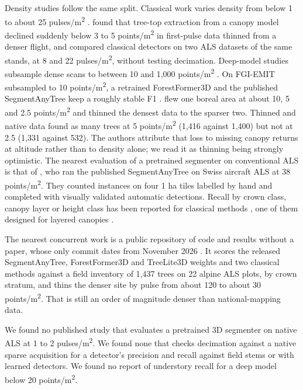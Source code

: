 \documentclass[preprint,12pt,authoryear,a4paper]{elsarticle}
\begin{document}
Density studies follow the same split. Classical work varies density from below
1 to about 25 pulses/m\textsuperscript{2} \citep{hirata2004effects,jakubowski2013tradeoffs,kaartinen2012international,sparks2022crosscomparison}. \citet{hirata2004effects}
found that tree-top extraction from a canopy model declined suddenly below 3 to
5 points/m\textsuperscript{2} in first-pulse data thinned from a denser flight, and
\citet{sparks2022crosscomparison} compared classical detectors on two ALS datasets of
the same stands, at 8 and 22 pulses/m\textsuperscript{2}, without testing decimation. Deep-model
studies subsample dense scans to between 10 and 1,000 points/m\textsuperscript{2}
\citep{wielgosz2024segmentanytree,xiang2025forestformer3d}. On FGI-EMIT subsampled
to 10 points/m\textsuperscript{2}, a retrained ForestFormer3D and the published SegmentAnyTree
keep a roughly stable F1 \citep{ruoppa2026benchmarking}. \citet{yu2004effects} flew one
boreal area at about 10, 5 and 2.5 points/m\textsuperscript{2} and thinned the densest data to the
sparser two. Thinned and native data found as many trees at 5 points/m\textsuperscript{2} (1,416
against 1,400) but not at 2.5 (1,331 against 532). The authors attribute that
loss to missing canopy returns at altitude rather than to density alone; we read
it as thinning being strongly optimistic. The nearest evaluation of a pretrained
segmenter on conventional ALS is that of \citet{destouches2026weaklysupervised}, who
ran the published SegmentAnyTree on Swiss aircraft ALS at 38 points/m\textsuperscript{2}. They
counted instances on four 1 ha tiles labelled by hand and completed with
visually validated automatic detections. Recall by crown class, canopy layer or
height class has been reported for classical methods \citep{wang2016international,hamraz2017forest,cao2023benchmarking}, one of them designed for layered
canopies \citep{hamraz2017forest}.

The nearest concurrent work is a public repository of code and results without a
paper, whose only commit dates from November 2026
\citep{mallacampoverde2026pretrained}. It scores the released SegmentAnyTree,
ForestFormer3D and TreeLite3D \citep{rizaldy2026labelefficient} weights and two
classical methods against a field inventory of 1,437 trees on 22 alpine ALS
plots, by crown stratum, and thins the denser site by pulse from about 120 to
about 30 points/m\textsuperscript{2}. That is still an order of magnitude denser than
national-mapping data.

We found no published study that evaluates a pretrained 3D segmenter on native
ALS at 1 to 2 pulses/m\textsuperscript{2}. We found none that checks decimation against a native
sparse acquisition for a detector's precision and recall against field stems or
with learned detectors. We found no report of understory recall for a deep model
below 20 points/m\textsuperscript{2}.
\end{document}
